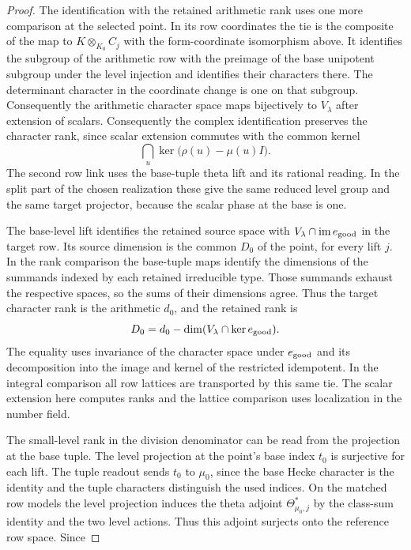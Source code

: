 \begin{proof}
The identification with the retained arithmetic rank uses
one more comparison at the selected point. In its row
coordinates the tie is the composite of the map to
$K\otimes_{K_0}C_j$ with the form-coordinate isomorphism
above. It identifies the subgroup of the arithmetic row
with the preimage of the base unipotent subgroup under the
level injection and identifies their characters there.
The determinant character in the coordinate change is
one on that subgroup. Consequently the arithmetic character
space maps bijectively to $V_\lambda$ after extension of
scalars.
Consequently the complex identification preserves the character rank, since scalar extension commutes with the common kernel
\[
  \bigcap_{u}\ker\big(\rho(u)-\mu(u)I\big).
\]
 The second row link uses the base-tuple theta
lift and its rational reading. In the split part of the
chosen realization these give the same reduced level
group and the same target projector, because the scalar
phase at the base is one.

The base-level lift identifies
the retained source space with
$V_\lambda\cap\operatorname{im}e_{\rm good}$ in the target
row. Its source dimension is the common $D_0$ of the
point, for every lift $j$. In the rank comparison the
base-tuple maps identify the dimensions of the summands
indexed by each retained irreducible type. Those summands
exhaust the respective spaces, so the sums of their
dimensions agree. Thus the target character rank
is the arithmetic $d_0$, and the retained rank is
\[
 D_0=d_0-\dim(V_\lambda\cap\ker e_{\rm good}).
\]
The equality uses invariance of the character space under
$e_{\rm good}$ and its decomposition into the image and
kernel of the restricted idempotent. In the integral
comparison all row lattices are transported by
this same tie. The scalar extension here computes ranks
and the lattice comparison uses localization in the
number field.\label{cor:paired-row-reading-4}

The small-level rank in the division denominator can be
read from the projection at the base tuple. The level
projection at the point's base index \(t_0\) is surjective
for each lift. The tuple readout sends \(t_0\) to \(\mu_0\),
since the base Hecke character is the identity and the
tuple characters distinguish the used indices.
On the matched row models the level projection induces the
theta adjoint \(\Theta_{\mu_0,j}^{*}\) by the class-sum identity
and the two level actions. Thus this adjoint surjects onto
the reference row space. Since


\end{proof}
